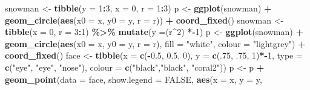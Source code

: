 \documentclass[
]{book}
\newenvironment{Shaded}{\begin{snugshade}}{\end{snugshade}}
\newcommand{\AttributeTok}[1]{\textcolor[rgb]{0.13,0.29,0.53}{#1}}
\newcommand{\ConstantTok}[1]{\textcolor[rgb]{0.56,0.35,0.01}{#1}}
\newcommand{\DecValTok}[1]{\textcolor[rgb]{0.00,0.00,0.81}{#1}}
\newcommand{\FloatTok}[1]{\textcolor[rgb]{0.00,0.00,0.81}{#1}}
\newcommand{\FunctionTok}[1]{\textcolor[rgb]{0.13,0.29,0.53}{\textbf{#1}}}
\newcommand{\NormalTok}[1]{#1}
\newcommand{\OtherTok}[1]{\textcolor[rgb]{0.56,0.35,0.01}{#1}}
\newcommand{\SpecialCharTok}[1]{\textcolor[rgb]{0.81,0.36,0.00}{\textbf{#1}}}
\newcommand{\StringTok}[1]{\textcolor[rgb]{0.31,0.60,0.02}{#1}}
\begin{document}
\begin{Shaded}
\begin{Highlighting}[]
\NormalTok{snowman }\OtherTok{\textless{}{-}} \FunctionTok{tibble}\NormalTok{(}\AttributeTok{y =} \DecValTok{1}\SpecialCharTok{:}\DecValTok{3}\NormalTok{, }\AttributeTok{x =} \DecValTok{0}\NormalTok{, }\AttributeTok{r =} \DecValTok{1}\SpecialCharTok{:}\DecValTok{3}\NormalTok{)}
\NormalTok{p }\OtherTok{\textless{}{-}} \FunctionTok{ggplot}\NormalTok{(snowman) }\SpecialCharTok{+} 
  \FunctionTok{geom\_circle}\NormalTok{(}\FunctionTok{aes}\NormalTok{(}\AttributeTok{x0 =}\NormalTok{ x, }\AttributeTok{y0 =}\NormalTok{ y, }\AttributeTok{r =}\NormalTok{ r)) }\SpecialCharTok{+} 
  \FunctionTok{coord\_fixed}\NormalTok{()}
\NormalTok{snowman }\OtherTok{\textless{}{-}} \FunctionTok{tibble}\NormalTok{(}\AttributeTok{x =} \DecValTok{0}\NormalTok{, }\AttributeTok{r =} \DecValTok{3}\SpecialCharTok{:}\DecValTok{1}\NormalTok{) }\SpecialCharTok{\%\textgreater{}\%} 
  \FunctionTok{mutate}\NormalTok{(}\AttributeTok{y =}\NormalTok{(r}\SpecialCharTok{\^{}}\DecValTok{2}\NormalTok{) }\SpecialCharTok{*{-}}\DecValTok{1}\NormalTok{)}
\NormalTok{p }\OtherTok{\textless{}{-}} \FunctionTok{ggplot}\NormalTok{(snowman) }\SpecialCharTok{+} 
  \FunctionTok{geom\_circle}\NormalTok{(}\FunctionTok{aes}\NormalTok{(}\AttributeTok{x0 =}\NormalTok{ x, }\AttributeTok{y0 =}\NormalTok{ y, }\AttributeTok{r =}\NormalTok{ r),}
              \AttributeTok{fill =} \StringTok{"white"}\NormalTok{, }
              \AttributeTok{colour =} \StringTok{"lightgrey"}\NormalTok{) }\SpecialCharTok{+} 
  \FunctionTok{coord\_fixed}\NormalTok{()}
\NormalTok{face }\OtherTok{\textless{}{-}} \FunctionTok{tibble}\NormalTok{(}\AttributeTok{x =} \FunctionTok{c}\NormalTok{(}\SpecialCharTok{{-}}\FloatTok{0.5}\NormalTok{, }\FloatTok{0.5}\NormalTok{, }\DecValTok{0}\NormalTok{),}
               \AttributeTok{y =} \FunctionTok{c}\NormalTok{(.}\DecValTok{75}\NormalTok{, .}\DecValTok{75}\NormalTok{, }\DecValTok{1}\NormalTok{)}\SpecialCharTok{*{-}}\DecValTok{1}\NormalTok{,}
  \AttributeTok{type =} \FunctionTok{c}\NormalTok{(}\StringTok{"eye"}\NormalTok{, }\StringTok{"eye"}\NormalTok{, }\StringTok{"nose"}\NormalTok{),}
  \AttributeTok{colour =} \FunctionTok{c}\NormalTok{(}\StringTok{"black"}\NormalTok{,}\StringTok{"black"}\NormalTok{, }\StringTok{"coral2"}\NormalTok{))}
\NormalTok{p }\OtherTok{\textless{}{-}}\NormalTok{ p }\SpecialCharTok{+} \FunctionTok{geom\_point}\NormalTok{(}\AttributeTok{data =}\NormalTok{ face, }\AttributeTok{show.legend =} \ConstantTok{FALSE}\NormalTok{,}
             \FunctionTok{aes}\NormalTok{(}\AttributeTok{x =}\NormalTok{ x, }\AttributeTok{y =}\NormalTok{ y, }

\end{Highlighting}
\end{Shaded}
\end{document}
